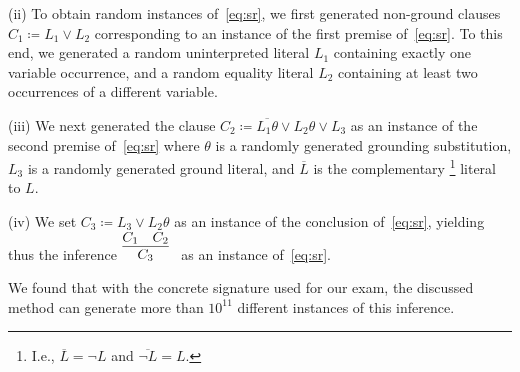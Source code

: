 \noindent (ii)  To obtain random instances of~\eqref{eq:sr}, 
we first generated non-ground clauses $C_1 \coloneqq L_1 \lor L_2$
corresponding to an instance of the first premise of~\eqref{eq:sr}.
To this end, we generated a random uninterpreted literal $L_1$ containing exactly one variable occurrence,
and a random equality literal $L_2$ containing at least two occurrences of a different variable.\smallskip


\noindent (iii)  We next generated the clause
$C_2 \coloneqq \overline{L_1\theta} \lor L_2\theta \lor L_3$
as an instance of the second premise of~\eqref{eq:sr}
where $\theta$ is a randomly generated grounding substitution,
$L_3$ is a randomly generated ground literal,
and
$\overline{L}$ is the complementary%
\footnote{I.e., $\overline{L} = \lnot L$ and $\overline{\lnot L} = L$.}
literal to $L$.\smallskip

\noindent (iv)
We set $C_3 \coloneqq L_3 \lor L_2\theta$ as an instance of the
conclusion of~\eqref{eq:sr}, yielding thus the inference $\infer[]{
      C_3
      }{
      C_1
      &
      {C_2}}$ as an instance of~\eqref{eq:sr}.\smallskip





We found that with the concrete signature used for our exam,
the discussed method can generate more than $10^{11}$ different instances
of this inference.
